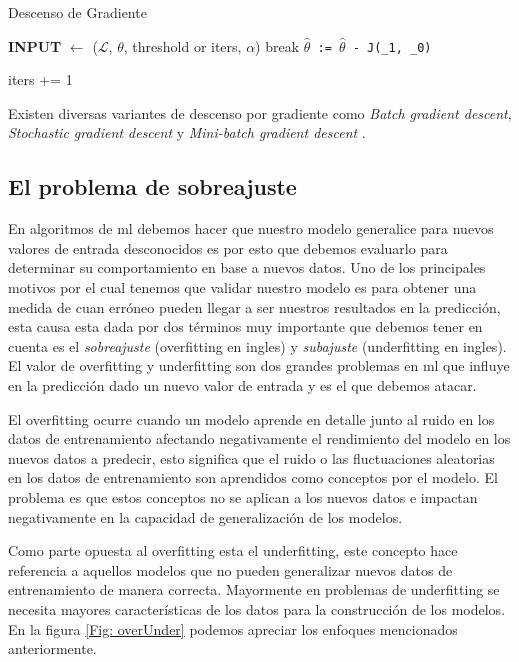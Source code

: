 \begin{algorithm}[H] \caption{Descenso de Gradiente}\label{euclid}
\begin{algorithmic}[1]
\State \textbf{INPUT} $\gets$ ($\mathcal{L}$, $\theta$, threshold or iters, $\alpha$)
	\State	break
\Else
	\State \texttt{$\hat\theta$ := $\hat\theta$ - \alpha \frac{\partial}{\partial \theta} J(\theta_{1}, \theta_{0})}
	
\EndIf
\State iters += 1
\EndWhile
\end{algorithmic}
\end{algorithm}


Existen diversas variantes de descenso por gradiente como \textit{Batch gradient descent}, \textit{Stochastic gradient descent} y \textit{Mini-batch gradient descent} \citep{variants_gd}.

\subsection{El problema de sobreajuste}\label{sub:validacion-modelo}

En algoritmos de \ac{ml} debemos hacer que nuestro modelo generalice para nuevos valores de entrada desconocidos es por esto que debemos evaluarlo para determinar su comportamiento en base a nuevos datos. Uno de los principales motivos por el cual tenemos que validar nuestro modelo es para obtener una medida de cuan erróneo pueden llegar a ser nuestros resultados en la predicción, esta causa esta dada por dos términos muy importante que debemos tener en cuenta es el \textit{sobreajuste} (overfitting en ingles) y \textit{subajuste} (underfitting en ingles). El valor de overfitting y underfitting son dos grandes problemas en \ac{ml} que influye en la predicción dado un nuevo valor de entrada y es el que debemos atacar. 

El overfitting ocurre cuando un modelo aprende en detalle junto al ruido en los datos de entrenamiento afectando negativamente el rendimiento del modelo en los nuevos datos a predecir, esto significa que el ruido o las fluctuaciones aleatorias en los datos de entrenamiento son aprendidos como conceptos por el modelo. El problema es que estos conceptos no se aplican a los nuevos datos e impactan negativamente en la capacidad de generalización de los modelos.

Como parte opuesta al overfitting esta el  underfitting, este concepto hace referencia a aquellos modelos que no pueden generalizar nuevos datos de entrenamiento de manera correcta. Mayormente en problemas de underfitting se necesita mayores características de los datos para la construcción de los modelos. En la figura \ref{Fig: overUnder} podemos apreciar los enfoques mencionados anteriormente.

